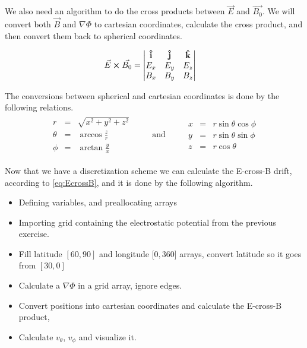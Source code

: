 \documentclass[x11names]{article}
\renewcommand{\va}{\vec}
\begin{document}
    We also need an algorithm to do the cross products between \(\va{E}\) and \(\va{B_0}\). We will convert both \(\va{B}\) and \( \nabla \Phi \) to cartesian coordinates, calculate the cross product, and then convert them back to spherical coordinates. 

    \begin{align}
      \va{E} \cross \va{B_0} &= 
      \begin{vmatrix}
        \vu{i} & \vu{j} &\vu{k}
        \\
        E_x & E_y & E_z
        \\
        B_x & B_y & B_z
      \end{vmatrix}
    \end{align}

    The conversions between spherical and cartesian coordinates is done by the following relations.
    \begin{align}
      \begin{matrix}
        r &=& \sqrt{x^2 + y^2 + z^2}
        \\
        \theta&=&   \arccos{\frac{z}{r}}
        \\
        \phi &=& \arctan{\frac{y}{x}}
      \end{matrix}  
    \qquad \text{ and } \qquad
      \begin{matrix}
        x &=& r\sin{\theta}\cos{\phi}
        \\
        y &=& r\sin{\theta}\sin{\phi}
        \\
        z &=& r\cos{\theta}
      \end{matrix}  
    \end{align}

    Now that we have a discretization scheme we can calculate the E-cross-B drift, according to \cref{eq:EcrossB}, and it is done by the following algorithm.

    \begin{itemize}
      \item Defining variables, and preallocating arrays
      \item Importing grid containing the electrostatic potential from the previous exercise.
      \item Fill latitude \([60,90]\) and longitude [\(0,360\)] arrays, convert latitude so it goes from \([30,0]\)
      \item Calculate a \(\nabla \Phi\) in a grid array, ignore edges.
      \item Convert positions into cartesian coordinates and calculate the E-cross-B product, 
      \item Calculate \(v_\theta\), \(v_\phi\) and visualize it. 
    \end{itemize}
\end{document}
